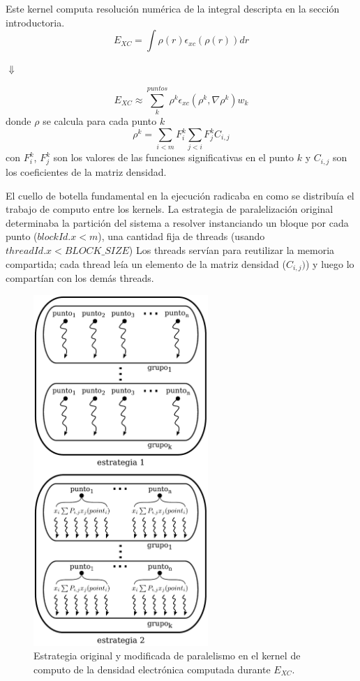 Este kernel computa resoluci\'on num\'erica de la integral descripta en la secci\'on introductoria.
\begin{equation}
    E_{XC} = \int \rho(r) \epsilon_{xc}\left( \rho(r) \right ) dr
\end{equation}
\begin{center}
    $\Downarrow$
\end{center}
\begin{equation}
  E_{XC} \approx \sum^{puntos}_k \rho^k \epsilon_{xc} (\rho^k,\nabla \rho^k) w_k
\end{equation}
donde $\rho$ se calcula para cada punto $k$
\begin{equation}
  \rho^k = \sum_{i<m} F^k_i \sum_{j<i} F^k_j C_{i,j}
\end{equation}
con $F^k_i$, $F^k_j$ son los valores de las funciones significativas en el punto $k$ y
$C_{i,j}$ son los coeficientes de la matriz densidad.

El cuello de botella fundamental en la ejecuci\'on radicaba en como se distribu\'ia el trabajo de computo
entre los kernels. La estrategia de paralelizaci\'on original determinaba la partici\'on
del sistema a resolver instanciando un bloque por cada punto ({$blockId.x < m$}),
una cantidad fija de threads (usando $threadId.x < BLOCK\_SIZE$)
Los threads serv\'ian para reutilizar la memoria compartida; cada thread le\'ia un
elemento de la matriz densidad ($C_{i,j})$) y luego lo compart\'ian con los
dem\'as threads.


\begin{figure}[htbp]
   \centering
   \includegraphics[width=250px]{images/cuda-parallelism.pdf}
   \caption{Estrategia original y modificada de paralelismo en el kernel de computo de la densidad
   electr\'onica computada durante $E_{XC}$.}
   \label{fig:cuda-xc-parallelism}
\end{figure}


